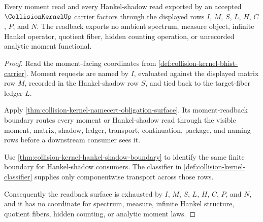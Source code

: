 \begin{theorem}
\label{thm:collision-kernel-moment-readback-exhaustion}
Every moment read and every Hankel-shadow read exported by an accepted $\CollisionKernelUp$ carrier factors through the displayed rows $I$, $M$, $S$, $L$, $H$, $C$, $P$, and $N$. The readback exports no ambient spectrum, measure object, infinite Hankel operator, quotient fiber, hidden counting operation, or unrecorded analytic moment functional.
\end{theorem}
\begin{proof}
Read the moment-facing coordinates from \autoref{def:collision-kernel-bhist-carrier}. Moment requests are named by $I$, evaluated against the displayed matrix row $M$, recorded in the Hankel-shadow row $S$, and tied back to the target-fiber ledger $L$.

Apply \autoref{thm:collision-kernel-namecert-obligation-surface}. Its moment-readback boundary routes every moment or Hankel-shadow read through the visible moment, matrix, shadow, ledger, transport, continuation, package, and naming rows before a downstream consumer sees it.

Use \autoref{thm:collision-kernel-hankel-shadow-boundary} to identify the same finite boundary for Hankel-shadow consumers. The classifier in \autoref{def:collision-kernel-classifier} supplies only componentwise transport across those rows.

Consequently the readback surface is exhausted by $I$, $M$, $S$, $L$, $H$, $C$, $P$, and $N$, and it has no coordinate for spectrum, measure, infinite Hankel structure, quotient fibers, hidden counting, or analytic moment laws.
\end{proof}

